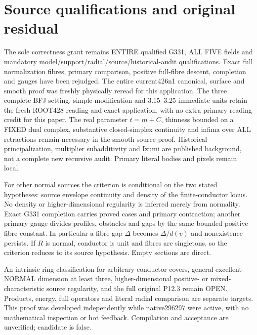 \documentclass[11pt]{article}
\begin{document}
\section{Source qualifications and original residual}
The sole correctness grant remains ENTIRE qualified G331, ALL FIVE fields
and mandatory model/support/radial/source/historical-audit qualifications.
Exact full normalization fibres, primary comparison, positive full-fibre
descent, completion and gauges have been rejudged. The entire current426n1
canonical, surface and smooth proof was freshly physically reread for this
application. The three complete BFJ setting, simple-modification and
3.15--3.25 immediate units retain the fresh ROOT428 reading and exact
application, with no extra primary reading credit for this paper.
The real parameter $t=m+C$, thinness bounded on a FIXED dual complex,
substantive closed-simplex continuity and infima over ALL retractions
remain necessary in the smooth source proof. Historical principalization,
multiplier subadditivity and Izumi are published background, not a complete
new recursive audit. Primary literal bodies and pixels remain local.

For other normal sources the criterion is conditional on the two stated
hypotheses: source envelope continuity and density of the finite-conductor
locus. No density or higher-dimensional regularity is inferred merely
from normality. Exact G331 completion carries proved cases and primary
contraction; another primary gauge divides profiles, obstacles and gaps
by the same bounded positive fibre constant. In particular a fibre gap
$\Delta$ becomes $\Delta/d(v)$ and nonexistence persists.
If $R$ is normal, conductor is unit and fibres are singletons, so the
criterion reduces to its source hypothesis. Empty sections are direct.

An intrinsic ring classification for arbitrary conductor covers, general
excellent NORMAL dimension at least three, higher-dimensional positive-
or mixed-characteristic source regularity, and the full original P12.3
remain OPEN. Products, energy, full operators and literal radial comparison
are separate targets. This proof was developed independently while
native296297 were active, with no mathematical inspection or hot feedback.
Compilation and acceptance are unverified; candidate is false.
\end{document}
